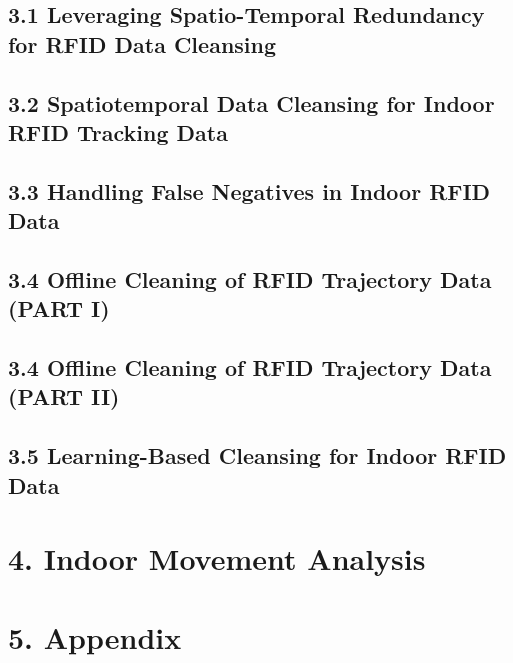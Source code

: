 \documentclass{beamer}
\begin{document}
\subsection{3.1 Leveraging Spatio-Temporal Redundancy for RFID Data Cleansing}

% 
% 

\subsection{3.2 Spatiotemporal Data Cleansing for Indoor RFID Tracking Data}

% 
% 

\subsection{3.3 Handling False Negatives in Indoor RFID Data}

% 
% 

\subsection{3.4 Offline Cleaning of RFID Trajectory Data (PART I)}

% 
% 

\subsection{3.4 Offline Cleaning of RFID Trajectory Data (PART II)}

% 
% 

\subsection{3.5 Learning-Based Cleansing for Indoor RFID Data}

% 
% 

\section{4. Indoor Movement Analysis}

\section{5. Appendix}
\end{document}
